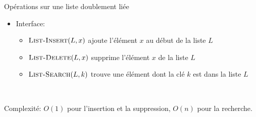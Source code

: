 \begin{frame}{Opérations sur une liste doublement liée}

\begin{itemize}
\item Interface:
    \begin{itemize}
    \item $\textnormal{\scshape List-Insert}(L,x)$ ajoute l'élément $x$ au début de la liste $L$
    \item $\textnormal{\scshape List-Delete}(L,x)$ supprime l'élément $x$ de la liste $L$
    \item $\textnormal{\scshape List-Search}(L,k)$ trouve une élément dont la clé $k$
      est dans la liste $L$
    \end{itemize}
\end{itemize}


\begin{center}
\begin{footnotesize}
~~~~~

\bigskip

\end{footnotesize}
\end{center}

Complexité: $O(1)$ pour l'insertion et la suppression, $O(n)$ pour la recherche.
\end{frame}

